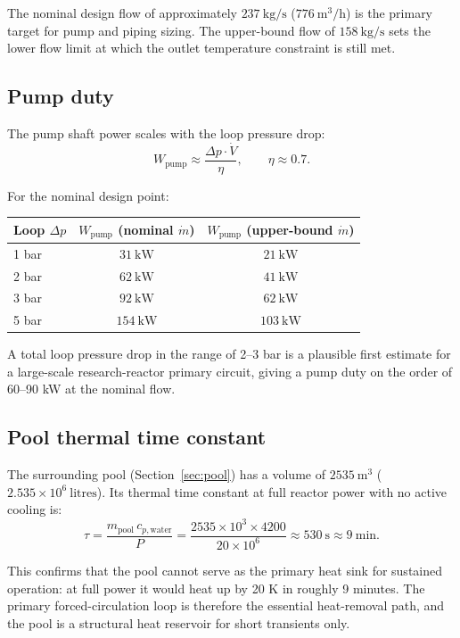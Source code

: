 \documentclass[11pt]{article}
\begin{document}
The nominal design flow of approximately $237\ \mathrm{kg/s}$
($776\ \mathrm{m^3/h}$) is the primary target for pump and piping sizing.
The upper-bound flow of $158\ \mathrm{kg/s}$ sets the lower flow limit
at which the outlet temperature constraint is still met.

\subsection{Pump duty}

The pump shaft power scales with the loop pressure drop:
\[
W_{\mathrm{pump}} \approx \frac{\Delta p \cdot \dot{V}}{\eta}, \qquad \eta \approx 0.7.
\]

For the nominal design point:

\begin{center}
\begin{tabular}{lcc}
\hline
Loop $\Delta p$ & $W_{\mathrm{pump}}$ (nominal $\dot{m}$) & $W_{\mathrm{pump}}$ (upper-bound $\dot{m}$) \\
\hline
1 bar & $31\ \mathrm{kW}$ & $21\ \mathrm{kW}$ \\
2 bar & $62\ \mathrm{kW}$ & $41\ \mathrm{kW}$ \\
3 bar & $92\ \mathrm{kW}$ & $62\ \mathrm{kW}$ \\
5 bar & $154\ \mathrm{kW}$ & $103\ \mathrm{kW}$ \\
\hline
\end{tabular}
\end{center}

A total loop pressure drop in the range of 2--3 bar is a plausible first
estimate for a large-scale research-reactor primary circuit, giving a pump
duty on the order of 60--90 kW at the nominal flow.

\subsection{Pool thermal time constant}

The surrounding pool (Section~\ref{sec:pool}) has a volume of
$2535\ \mathrm{m^3}$ ($2.535 \times 10^6\ \mathrm{litres}$).  Its
thermal time constant at full reactor power with no active cooling is:
\[
\tau = \frac{m_{\mathrm{pool}}\,c_{p,\mathrm{water}}}{P}
= \frac{2535 \times 10^3 \times 4200}{20 \times 10^6}
\approx 530\ \mathrm{s}
\approx 9\ \mathrm{min}.
\]

This confirms that the pool cannot serve as the primary heat sink for
sustained operation: at full power it would heat up by 20 K in roughly
9 minutes.  The primary forced-circulation loop is therefore the
essential heat-removal path, and the pool is a structural heat reservoir
for short transients only.
\end{document}
